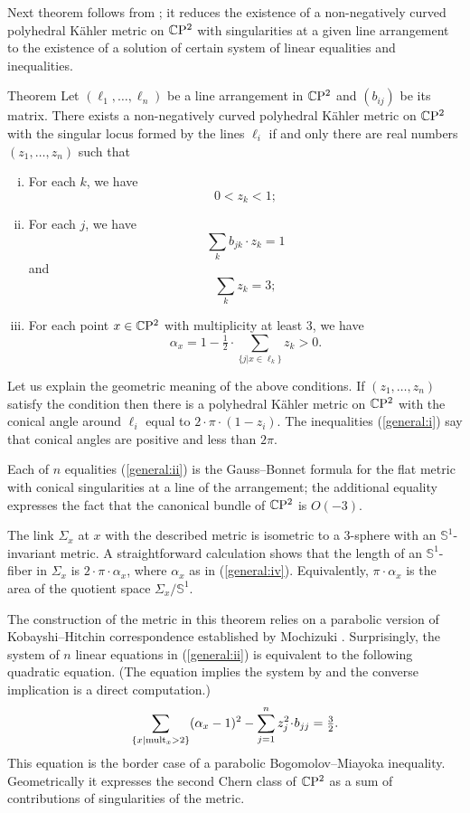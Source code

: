 \documentclass[oneside,a4paper]{article}
\def\SS{\mathbb{S}}
\begin{document}
Next theorem follows from \cite[Theorem 1.12, Lemma 7.9]{panov};
it reduces the existence of a non-negatively curved polyhedral K\"ahler metric on $\mathbb{C}\mathrm{P}^2$
with singularities at a given
line arrangement to the existence of a solution of certain system of linear equalities and inequalities.

\begin{thm}{Theorem}\label{general} Let $(\ell_1,\dots,\ell_n)$ be a line arrangement in $\mathbb{C}\mathrm{P}^2$ and $(b_{ij})$ be its matrix.
There exists a non-negatively curved polyhedral K\"ahler metric on $\mathbb{C}\mathrm{P}^2$
with the singular locus formed by the lines $\ell_i$
if and only there are real numbers $(z_1,\dots,z_n)$
such that
\begin{enumerate}[(i)]
\item \label{general:i}For each $k$, we have
\[0<z_k<1;\]
\item \label{general:ii}For each $j$, we have
\[\sum_{k} b_{jk}\cdot z_k=1\]
and \[\sum_{k} z_k=3;\]
\item\label{general:iv} For each point $x\in\mathbb{C}\mathrm{P}^2$ with multiplicity at least 3, we have%
\[\alpha_x=1-\tfrac{1}{2}\cdot\sum_{\{j|x\in \ell_k\}}z_k>0.\]
\end{enumerate}
\end{thm}


Let us explain the geometric meaning of the above conditions.
If $(z_1,\dots,z_n)$ satisfy the condition then
there is a polyhedral K\"ahler metric on $\mathbb{C}\mathrm{P}^2$
with the conical angle around $\ell_i$ equal to $2\cdot\pi\cdot(1-z_i)$.
The inequalities (\ref{general:i}) say that conical angles are positive and less than $2\pi$.

Each of $n$ equalities (\ref{general:ii}) 
is the Gauss--Bonnet formula
for the flat metric with conical singularities at a line of the arrangement;
the additional equality expresses the fact that the canonical bundle of
$\mathbb{C}\mathrm{P}^2$ is $O(-3)$.

The link $\Sigma_x$ at $x$ with the described metric
is isometric to a $3$-sphere with an $\SS^1$-invariant metric.
A straightforward calculation shows that
the length of an $\SS^1$-fiber in $\Sigma_x$ is $2\cdot\pi\cdot\alpha_x$,
where $\alpha_x$ as in (\ref{general:iv}).
Equivalently, $\pi\cdot\alpha_x$ is the area of the quotient space $\Sigma_x/\SS^1$.

The construction of the metric in this theorem relies on a parabolic version of Kobayshi--Hitchin correspondence
established by Mochizuki \cite{mochizuki}. 
Surprisingly, the system of $n$ linear equations in
(\ref{general:ii}) is equivalent to the following quadratic equation. 
(The equation 
implies the system by  \cite[Lemma 7.9]{panov} and  the converse implication 
is a direct computation.)
$$\sum_{\{x|\mult_x>2\}}(\alpha_x-1)^2
-
\sum_{j=1}^nz_j^2\cdot b_{jj}
=
\tfrac{3}{2}.$$
This equation is the border case of a parabolic Bogomolov--Miayoka inequality. Geometrically
it expresses the second Chern class of $\mathbb{C}\mathrm{P}^2$ as a sum of contributions of
singularities of the metric.
\end{document}
